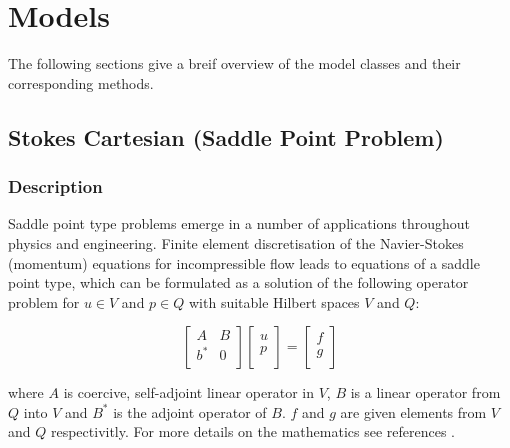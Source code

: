 
%
%
%


\chapter{Models}

The following sections give a breif overview of the model classes and their corresponding methods.

\section{Stokes Cartesian (Saddle Point Problem)}

\subsection{Description}

Saddle point type problems emerge in a number of applications throughout physics and engineering. Finite element discretisation of the Navier-Stokes (momentum) equations for incompressible flow leads to equations of a saddle point type, which can be formulated as a solution of the following operator problem for $u \in V$ and $p \in Q$ with suitable Hilbert spaces $V$ and $Q$:

\begin{equation}
\left[ \begin{array}{cc}
A     & B \\
b^{*} & 0 \\
\end{array} \right]
\left[ \begin{array}{c}
u \\
p \\
\end{array} \right]
=\left[ \begin{array}{c}
f \\
g \\
\end{array} \right]
\label{SADDLEPOINT}
\end{equation}

where $A$ is coercive, self-adjoint linear operator in $V$, $B$ is a linear operator from $Q$ into $V$ and $B^{*}$ is the adjoint operator of $B$. $f$ and $g$ are given elements from $V$ and $Q$ respectivitly. For more details on the mathematics see references \cite{AAMIRBERKYAN2008,MBENZI2005}.

